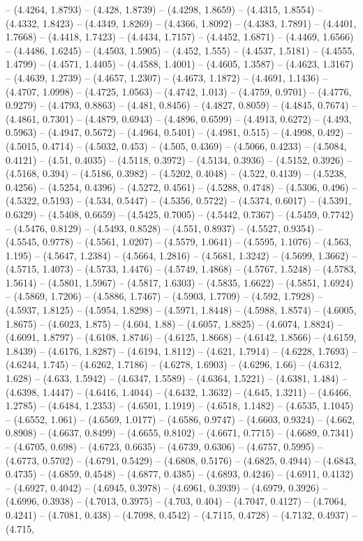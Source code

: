 -- (4.4264, 1.8793) -- (4.428, 1.8739) -- (4.4298, 1.8659) -- (4.4315, 1.8554) -- (4.4332, 1.8423) -- (4.4349, 1.8269) -- (4.4366, 1.8092) -- (4.4383, 1.7891) -- (4.4401, 1.7668) -- (4.4418, 1.7423) -- (4.4434, 1.7157) -- (4.4452, 1.6871) -- (4.4469, 1.6566) -- (4.4486, 1.6245) -- (4.4503, 1.5905) -- (4.452, 1.555) -- (4.4537, 1.5181) -- (4.4555, 1.4799) -- (4.4571, 1.4405) -- (4.4588, 1.4001) -- (4.4605, 1.3587) -- (4.4623, 1.3167) -- (4.4639, 1.2739) -- (4.4657, 1.2307) -- (4.4673, 1.1872) -- (4.4691, 1.1436) -- (4.4707, 1.0998) -- (4.4725, 1.0563) -- (4.4742, 1.013) -- (4.4759, 0.9701) -- (4.4776, 0.9279) -- (4.4793, 0.8863) -- (4.481, 0.8456) -- (4.4827, 0.8059) -- (4.4845, 0.7674) -- (4.4861, 0.7301) -- (4.4879, 0.6943) -- (4.4896, 0.6599) -- (4.4913, 0.6272) -- (4.493, 0.5963) -- (4.4947, 0.5672) -- (4.4964, 0.5401) -- (4.4981, 0.515) -- (4.4998, 0.492) -- (4.5015, 0.4714) -- (4.5032, 0.453) -- (4.505, 0.4369) -- (4.5066, 0.4233) -- (4.5084, 0.4121) -- (4.51, 0.4035) -- (4.5118, 0.3972) -- (4.5134, 0.3936) -- (4.5152, 0.3926) -- (4.5168, 0.394) -- (4.5186, 0.3982) -- (4.5202, 0.4048) -- (4.522, 0.4139) -- (4.5238, 0.4256) -- (4.5254, 0.4396) -- (4.5272, 0.4561) -- (4.5288, 0.4748) -- (4.5306, 0.496) -- (4.5322, 0.5193) -- (4.534, 0.5447) -- (4.5356, 0.5722) -- (4.5374, 0.6017) -- (4.5391, 0.6329) -- (4.5408, 0.6659) -- (4.5425, 0.7005) -- (4.5442, 0.7367) -- (4.5459, 0.7742) -- (4.5476, 0.8129) -- (4.5493, 0.8528) -- (4.551, 0.8937) -- (4.5527, 0.9354) -- (4.5545, 0.9778) -- (4.5561, 1.0207) -- (4.5579, 1.0641) -- (4.5595, 1.1076) -- (4.563, 1.195) -- (4.5647, 1.2384) -- (4.5664, 1.2816) -- (4.5681, 1.3242) -- (4.5699, 1.3662) -- (4.5715, 1.4073) -- (4.5733, 1.4476) -- (4.5749, 1.4868) -- (4.5767, 1.5248) -- (4.5783, 1.5614) -- (4.5801, 1.5967) -- (4.5817, 1.6303) -- (4.5835, 1.6622) -- (4.5851, 1.6924) -- (4.5869, 1.7206) -- (4.5886, 1.7467) -- (4.5903, 1.7709) -- (4.592, 1.7928) -- (4.5937, 1.8125) -- (4.5954, 1.8298) -- (4.5971, 1.8448) -- (4.5988, 1.8574) -- (4.6005, 1.8675) -- (4.6023, 1.875) -- (4.604, 1.88) -- (4.6057, 1.8825) -- (4.6074, 1.8824) -- (4.6091, 1.8797) -- (4.6108, 1.8746) -- (4.6125, 1.8668) -- (4.6142, 1.8566) -- (4.6159, 1.8439) -- (4.6176, 1.8287) -- (4.6194, 1.8112) -- (4.621, 1.7914) -- (4.6228, 1.7693) -- (4.6244, 1.745) -- (4.6262, 1.7186) -- (4.6278, 1.6903) -- (4.6296, 1.66) -- (4.6312, 1.628) -- (4.633, 1.5942) -- (4.6347, 1.5589) -- (4.6364, 1.5221) -- (4.6381, 1.484) -- (4.6398, 1.4447) -- (4.6416, 1.4044) -- (4.6432, 1.3632) -- (4.645, 1.3211) -- (4.6466, 1.2785) -- (4.6484, 1.2353) -- (4.6501, 1.1919) -- (4.6518, 1.1482) -- (4.6535, 1.1045) -- (4.6552, 1.061) -- (4.6569, 1.0177) -- (4.6586, 0.9747) -- (4.6603, 0.9324) -- (4.662, 0.8908) -- (4.6637, 0.8499) -- (4.6655, 0.8102) -- (4.6671, 0.7715) -- (4.6689, 0.7341) -- (4.6705, 0.698) -- (4.6723, 0.6635) -- (4.6739, 0.6306) -- (4.6757, 0.5995) -- (4.6773, 0.5702) -- (4.6791, 0.5429) -- (4.6808, 0.5176) -- (4.6825, 0.4944) -- (4.6843, 0.4735) -- (4.6859, 0.4548) -- (4.6877, 0.4385) -- (4.6893, 0.4246) -- (4.6911, 0.4132) -- (4.6927, 0.4042) -- (4.6945, 0.3978) -- (4.6961, 0.3939) -- (4.6979, 0.3926) -- (4.6996, 0.3938) -- (4.7013, 0.3975) -- (4.703, 0.404) -- (4.7047, 0.4127) -- (4.7064, 0.4241) -- (4.7081, 0.438) -- (4.7098, 0.4542) -- (4.7115, 0.4728) -- (4.7132, 0.4937) -- (4.715, 